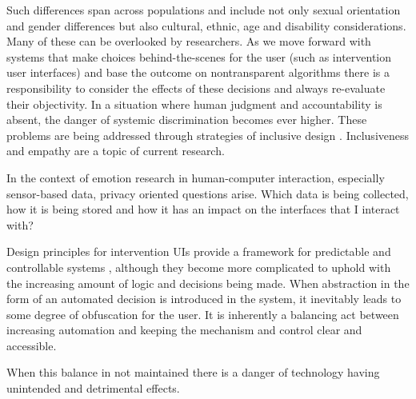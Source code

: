 Such differences span across populations and include not only sexual orientation and gender differences but also cultural, ethnic, age and disability considerations. Many of these can be overlooked by researchers. As we move forward with systems that make choices behind-the-scenes for the user (such as intervention user interfaces) and base the outcome on nontransparent algorithms there is a responsibility to consider the effects of these decisions and always re-evaluate their objectivity. In a situation where human judgment and accountability is absent, the danger of systemic discrimination becomes ever higher. These problems are being addressed through strategies of inclusive design \cite{Clarkson2003}. Inclusiveness and empathy are a topic of current research.

In the context of emotion research in human-computer interaction, especially sensor-based data, privacy oriented questions arise. Which data is being collected, how it is being stored and how it has an impact on the interfaces that I interact with? \cite{Yun2016}

Design principles for intervention UIs provide a framework for predictable and controllable systems \cite{Schmidt2017}, although they become more complicated to uphold with the increasing amount of logic and decisions being made. When abstraction in the form of an automated decision is introduced in the system, it inevitably leads to some degree of obfuscation for the user. It is inherently a balancing act between increasing automation and keeping the mechanism and control clear and accessible.

When this balance in not maintained there is a danger of technology having unintended and detrimental effects.

%



